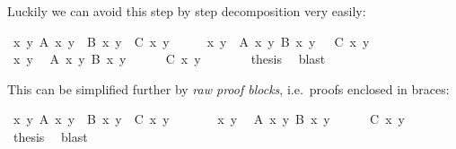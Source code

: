 \begin{isabellebody}
\begin{isamarkuptext}
Luckily we can avoid this step by step decomposition very easily:%
\end{isamarkuptext}%
\isamarkuptrue%
\isamarkupfalse%
\ {\isachardoublequoteopen}{\isasymforall}x\ y{\isachardot}\ A\ x\ y\ {\isasymand}\ B\ x\ y\ {\isasymlongrightarrow}\ C\ x\ y{\isachardoublequoteclose}\isanewline
%
\isadelimproof
%
\endisadelimproof
%
\isatagproof
{}\isamarkupfalse%
\ {\isacharminus}\isanewline
\ \ \isamarkupfalse%
\ {\isachardoublequoteopen}{\isasymAnd}x\ y{\isachardot}\ {\isasymlbrakk}\ A\ x\ y{\isacharsemicolon}\ B\ x\ y\ {\isasymrbrakk}\ {\isasymLongrightarrow}\ C\ x\ y{\isachardoublequoteclose}\isanewline
\ \ \isamarkupfalse%
\ {\isacharminus}\isanewline
\ \ \ \ \isamarkupfalse%
\ x\ y\ \isamarkupfalse%
\ {\isachardoublequoteopen}A\ x\ y{\isachardoublequoteclose}\ {\isachardoublequoteopen}B\ x\ y{\isachardoublequoteclose}\isanewline
\ \ \ \ \isamarkupfalse%
\ {\isachardoublequoteopen}C\ x\ y{\isachardoublequoteclose}\ \isamarkupfalse%
\isanewline
\ \ \isamarkupfalse%
\isanewline
\ \ \isamarkupfalse%
\ {\isacharquery}thesis\ \isamarkupfalse%
\ blast\isanewline
{}\isamarkupfalse%
%
\endisatagproof
{\isafoldproof}%
%
\isadelimproof
%
\endisadelimproof
%
\begin{isamarkuptext}%
\noindent
This can be simplified further by \emph{raw proof blocks}, i.e.\
proofs enclosed in braces:%
\end{isamarkuptext}%
\isamarkuptrue%
\isamarkupfalse%
\ {\isachardoublequoteopen}{\isasymforall}x\ y{\isachardot}\ A\ x\ y\ {\isasymand}\ B\ x\ y\ {\isasymlongrightarrow}\ C\ x\ y{\isachardoublequoteclose}\isanewline
%
\isadelimproof
%
\endisadelimproof
%
\isatagproof
{}\isamarkupfalse%
\ {\isacharminus}\isanewline
\ \ \isacommand{{\isacharbraceleft}}\isamarkupfalse%
\ \isamarkupfalse%
\ x\ y\ \isamarkupfalse%
\ {\isachardoublequoteopen}A\ x\ y{\isachardoublequoteclose}\ {\isachardoublequoteopen}B\ x\ y{\isachardoublequoteclose}\isanewline
\ \ \ \ \isacommand{have}\isamarkupfalse%
\ {\isachardoublequoteopen}C\ x\ y{\isachardoublequoteclose}\ \isamarkupfalse%
\ \isacommand{{\isacharbraceright}}\isamarkupfalse%
\isanewline
\ \ \isamarkupfalse%
\ {\isacharquery}thesis\ \isamarkupfalse%
\ blast\isanewline
{}\isamarkupfalse%
%
\endisatagproof
{\isafoldproof}%

\end{isabellebody}
